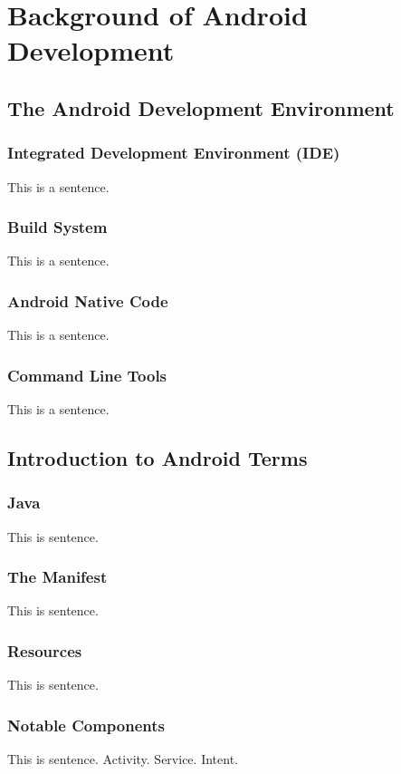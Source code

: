 \chapter{Background of Android Development}
%
\label{ch:background}

\section{The Android Development Environment}
\subsection{Integrated Development Environment (IDE)}
This is a sentence.

\subsection{Build System}
This is a sentence.

\subsection{Android Native Code}
This is a sentence.

\subsection{Command Line Tools}
This is a sentence.

\section{Introduction to Android Terms}
\subsection{Java}
This is sentence.

\subsection{The Manifest}
This is sentence.

\subsection{Resources}
This is sentence.

\subsection{Notable Components}
This is sentence.
Activity.
Service.
Intent.

